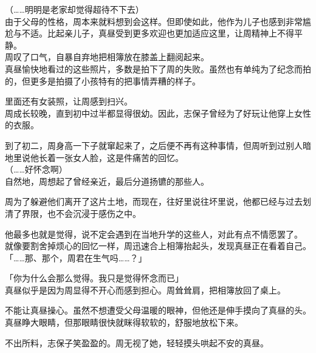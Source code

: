 （……明明是老家却觉得超待不下去）\\

由于父母的性格，周本来就料想到会这样。但即使如此，他作为儿子也感到非常尴尬与不适。比起亲儿子，真昼受到更多欢迎也更加适应这里，让周精神上不得平静。\\

周叹了口气，自暴自弃地把相簿放在膝盖上翻阅起来。\\

真昼愉快地看过的这些照片，多数是拍下了周的失败。虽然也有单纯为了纪念而拍的，但更多是拍摄了小孩特有的把事情弄糟的样子。

里面还有女装照，让周感到扫兴。\\

周成长较晚，直到初中过半都显得很幼。因此，志保子曾经为了好玩让他穿上女性的衣服。

到了初二，周身高一下子就窜起来了，之后便不再有这种事情，但周听到过别人暗地里说他长着一张女人脸，这是件痛苦的回忆。\\

（……好怀念啊）\\

自然地，周想起了曾经亲近，最后分道扬镳的那些人。

周为了躲避他们离开了这片土地，而现在，往好里说往坏里说，他都已经与过去划清了界限，也不会沉浸于感伤之中。

他最多也就是觉得，说不定会遇到在当地升学的这些人，对此有点不情愿罢了。\\

就像要割舍掉烦心的回忆一样，周迅速合上相簿抬起头，发现真昼正在看着自己。\\

「……那、那个，周君在生气吗……？」

「你为什么会那么觉得。我只是觉得怀念而已」\\

真昼似乎是因为周显得不开心而感到担心。周耸耸肩，把相簿放回了桌上。

不能让真昼操心。虽然不想遭受父母温暖的眼神，但他还是伸手摸向了真昼的头。\\

真昼睁大眼睛，但那眼睛很快就眯得软软的，舒服地放松下来。

不出所料，志保子笑盈盈的。周无视了她，轻轻摸头哄起不安的真昼。

